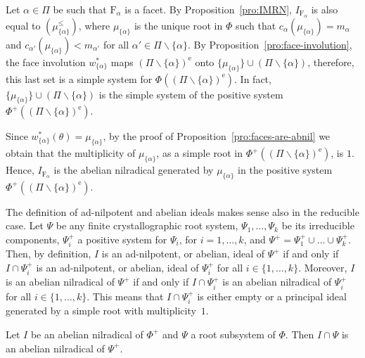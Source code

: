 \documentclass[ALCO,published]{cedram}
\theoremstyle{plain}
\newcommand\smeno{\smallsetminus}
\newcommand\al{\alpha}
\newcommand\erm{{\mathrm{e}}}
\renewcommand{\leq}{\leqslant}
\begin{document}
\begin{rem}\label{rem:abnil}
Let $\al\in \Pi$ be such that $\mathrm F_\al$ is a facet. 
By Proposition~\ref{pro:IMRN}, $I_{\mathrm F_\al}$ is also equal to $(\mu_{\{\al\}}^\leq)$, where  $\mu_{\{\al\}}$  is the unique root in $\Phi$ such that $c_\al(\mu_{\{\al\}})=m_\al$ and $c_{\al'}(\mu_{\{\al\}})<m_{\al'}$ for all $\al'\in\Pi\smeno\{\al\}$.  
By Proposition~\ref{pro:face-involution}, the face involution $w_{\{\al\}}^*$ maps $(\Pi\smeno\{\al\})^\erm$ onto $\{\mu_{\{\al\}}\}\cup (\Pi\smeno\{\al\})$, therefore, this last set is a simple system for $\Phi((\Pi\smeno\{\al\})^\erm)$. 
In fact,  $\{\mu_{\{\al\}}\}\cup (\Pi\smeno\{\al\})$ is the simple system of the positive system $\Phi^+((\Pi\smeno\{\al\})^\erm)$.

\par 
Since $w_{\{\al\}}^*(\theta)=\mu_{\{\al\}}$, by the proof of Proposition~\ref{pro:faces-are-abnil} we obtain that the multiplicity of $\mu_{\{\al\}}$, as a simple root in $\Phi^+((\Pi\smeno\{\al\})^\erm)$, is $1$. 
Hence, $I_{\mathrm F_\al}$ is the abelian nilradical generated by $\mu_{\{\al\}}$ in the  positive system $\Phi^+((\Pi\smeno\{\al\})^\erm)$.
\end{rem}

The definition of ad-nilpotent and abelian ideals makes sense also in the reducible case. 
Let $\Psi$ be any finite crystallographic root system, $\Psi_1, \dots, \Psi_k$ be its irreducible components, $\Psi_i^+$ a positive system for $\Psi_i$, for $i=1, \dots, k$, and $\Psi^+=\Psi_1^+\cup\dots\cup \Psi_k^+$. 
Then, by definition, $I$ is an ad-nilpotent, or abelian, ideal of $\Psi^+$ if and only if $I\cap \Psi_i^+$ is an ad-nilpotent, or abelian, ideal of $\Psi_i^+$ for all $i\in\{1, \dots, k\}$. 
Moreover,  $I$ is an abelian nilradical of $\Psi^+$ if and only if $I\cap \Psi_i^+$ is an abelian nilradical of $\Psi_i^+$ for all $i\in\{1, \dots, k\}$. This means that $I\cap \Psi_i^+$ is either empty  or a principal ideal generated by a simple root with multiplicity~$1$.

\begin{pro}\label{pro:induzione}
Let $I$ be an abelian nilradical of $\Phi^+$ and $\Psi$ a root subsystem of $\Phi$.
Then $I\cap \Psi$ is an abelian nilradical  of $\Psi^+$.
\end{pro}
\end{document}
